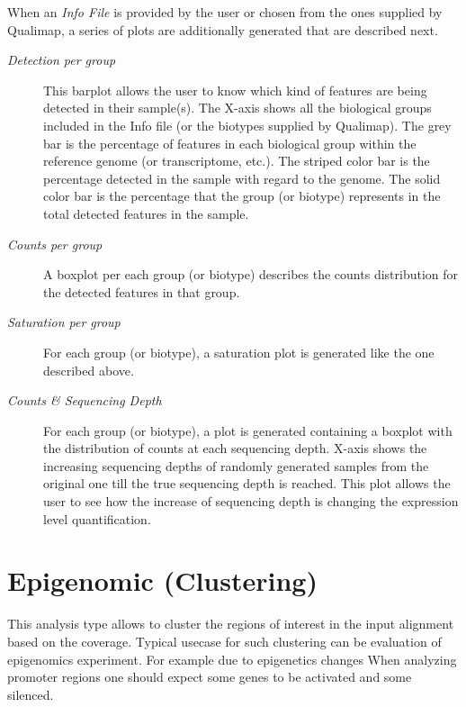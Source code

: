 \documentclass[a4paper,10pt,english]{sphinxmanual}
\begin{document}
When an \emph{Info File} is provided by the user or chosen from the ones supplied by Qualimap, a series of plots are additionally generated that are described next.
\begin{description}
\item[{\emph{Detection per group}}] \leavevmode
This barplot allows the user to know which kind of features are being detected in their sample(s). The X-axis shows all the biological groups included in the Info file (or the biotypes supplied by Qualimap). The grey bar is the percentage of features in each biological group within the reference genome (or transcriptome, etc.). The striped color bar is the percentage detected in the sample with regard to the genome. The solid color bar is the percentage that the group (or biotype) represents in the total detected features in the sample.

\item[{\emph{Counts per group}}] \leavevmode
A boxplot per each group (or biotype) describes the counts distribution for the detected features in that group.

\item[{\emph{Saturation per group}}] \leavevmode
For each group (or biotype), a saturation plot is generated like the one described above.

\item[{\emph{Counts \& Sequencing Depth}}] \leavevmode
For each group (or biotype), a plot is generated containing a boxplot with the distribution of counts at each sequencing depth. X-axis shows the increasing sequencing depths of randomly generated samples from the original one till the true sequencing depth is reached. This plot allows the user to see how the increase of sequencing depth is changing the expression level quantification.

\end{description}


\section{Epigenomic (Clustering)}
\label{analysis:epigenomic}\label{analysis:epigenomic-clustering}
This analysis type allows to cluster the regions of interest in the input alignment based on the coverage. Typical usecase for such clustering can be evaluation of epigenomics experiment. For example due to epigenetics changes When analyzing promoter regions one should expect some genes to be activated and some silenced.
\end{document}
